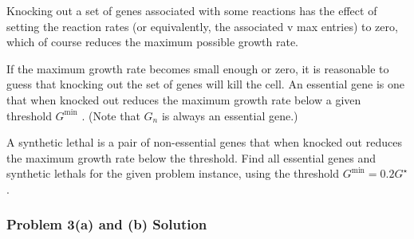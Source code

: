 \documentclass[
  letterpaper,
  DIV=11,
  numbers=noendperiod]{scrartcl}
\begin{document}
Knocking out a set of genes associated with some reactions has the
effect of setting the reaction rates (or equivalently, the associated v
max entries) to zero, which of course reduces the maximum possible
growth rate.

If the maximum growth rate becomes small enough or zero, it is
reasonable to guess that knocking out the set of genes will kill the
cell. An essential gene is one that when knocked out reduces the maximum
growth rate below a given threshold \(G^{\mathrm{min}}\) . (Note that
\(G_n\) is always an essential gene.)

A synthetic lethal is a pair of non-essential genes that when knocked
out reduces the maximum growth rate below the threshold. Find all
essential genes and synthetic lethals for the given problem instance,
using the threshold \(G^{\mathrm{min}} = 0.2G^{\star}\) .

\subsubsection{Problem 3(a) and (b)
Solution}\label{problem-3a-and-b-solution}
\end{document}
